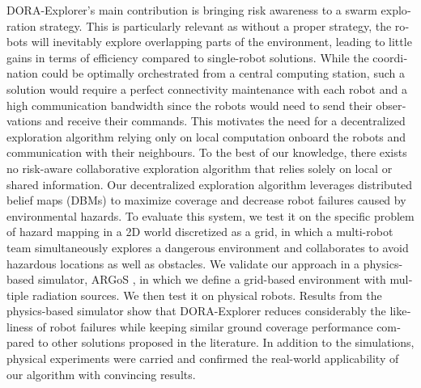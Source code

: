 \begin{otherlanguage}{english}
DORA-Explorer's main contribution is bringing risk awareness to a swarm exploration strategy. This is particularly relevant as without a proper strategy, the robots
will inevitably explore overlapping parts of the environment, leading
to little gains in terms of efficiency compared to single-robot
solutions. While the coordination could be optimally orchestrated from
a central computing station, such a solution would require a perfect
connectivity maintenance with each robot and a high communication
bandwidth since the robots would need to send their observations and
receive their commands. This motivates the need for a decentralized
exploration algorithm relying only on local computation onboard the
robots and communication with their neighbours. To the best of our knowledge, there exists no risk-aware collaborative exploration algorithm that relies solely on local or shared
information. Our decentralized exploration algorithm leverages distributed belief maps (DBMs) to maximize coverage and decrease robot failures caused by environmental hazards. To evaluate this system, we test it on the specific problem of
hazard mapping in a 2D world discretized as a grid, in which a
multi-robot team simultaneously explores a dangerous environment and
collaborates to avoid hazardous locations as well as obstacles. We validate our approach in a physics-based simulator, ARGoS
\cite{Pinciroli:SI2012}, in which we define a grid-based environment
with multiple radiation sources. We then test it on physical
robots. Results from the physics-based simulator show that DORA-Explorer reduces considerably the likeliness of robot failures while keeping similar ground coverage performance compared to other solutions proposed in the literature. In addition to the simulations, physical experiments were carried and confirmed the real-world applicability of our algorithm with convincing results. 


\end{otherlanguage}
